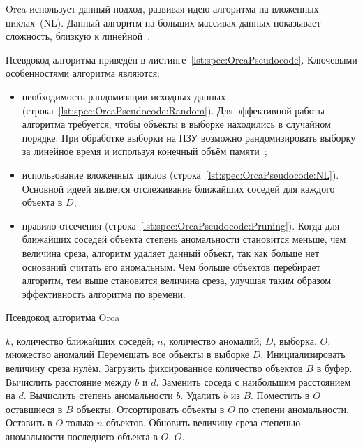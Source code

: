 Orca использует данный подход, развивая идею алгоритма на вложенных циклах~(NL). Данный алгоритм на больших массивах данных показывает сложность, близкую к линейной~\cite{BaySchwabacherOrca}.

Псевдокод алгоритма приведён в листинге~\ref{lst:spec:OrcaPseudocode}. Ключевыми особенностями алгоритма являются:
\begin{itemize}
	\item необходимость рандомизации исходных данных (строка~\ref{lst:spec:OrcaPseudocode:Random}). Для эффективной работы алгоритма требуется, чтобы объекты в выборке находились в случайном порядке. При обработке выборки на ПЗУ возможно рандомизировать выборку за линейное время и используя конечный объём памяти~\cite{BaySchwabacherOrca};
	\item использование вложенных циклов (строка~\ref{lst:spec:OrcaPseudocode:NL}). Основной идеей является отслеживание ближайших соседей для каждого объекта в $D$;
	\item правило отсечения (строка~\ref{lst:spec:OrcaPseudocode:Pruning}). Когда для ближайших соседей объекта степень аномальности становится меньше, чем величина среза, алгоритм удаляет данный объект, так как больше нет оснований считать его аномальным. Чем больше объектов перебирает алгоритм, тем выше становится величина среза, улучшая таким образом эффективность алгоритма по времени.
\end{itemize}

\begin{algorithm}[h]
\caption{Псевдокод алгоритма Orca}
\label{lst:spec:OrcaPseudocode}
\begin{algorithmic}[1]
\REQUIRE $k$, количество ближайших соседей; $n$, количество аномалий; $D$, выборка.
\ENSURE $O$, множество аномалий
\STATE Перемешать все объекты в выборке $D$. \label{lst:spec:OrcaPseudocode:Random}
\STATE Инициализировать величину среза нулём.
	\STATE Загрузить фиксированное количество объектов $B$ в буфер.
	 \label{lst:spec:OrcaPseudocode:NL}
			\STATE Вычислить расстояние между $b$ и $d$.
				\STATE Заменить соседа с наибольшим расстоянием на $d$.
				\STATE Вычислить степень аномальности $b$.
				 \label{lst:spec:OrcaPseudocode:Pruning}
					\STATE Удалить $b$ из $B$.
				\ENDIF
			\ENDIF
		\ENDFOR
	\ENDFOR
	\STATE Поместить в $O$ оставшиеся в $B$ объекты.
	\STATE Отсортировать объекты в $O$ по степени аномальности.
	\STATE Оставить в $O$ только $n$ объектов.
	\STATE Обновить величину среза степенью аномальности последнего объекта в $O$.
\ENDWHILE
\RETURN $O$.
\end{algorithmic}
\end{algorithm}

